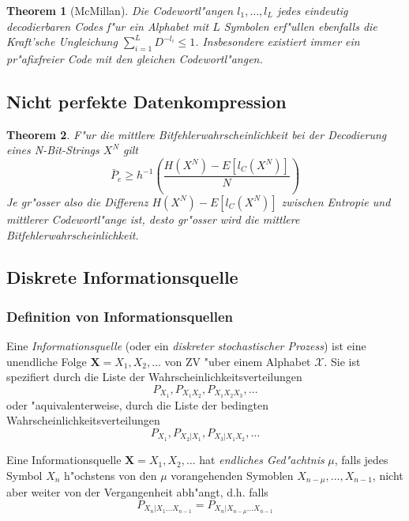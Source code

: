 \documentclass[german, 10pt, a4paper, twocolumn]{scrartcl}
\newtheorem{theorem}{Theorem}
\begin{document}
\begin{theorem}[McMillan]
	Die Codewortl"angen $l_1,\ldots,l_L$ jedes eindeutig decodierbaren Codes f"ur ein Alphabet mit $L$ Symbolen erf"ullen ebenfalls die Kraft'sche Ungleichung $\sum^L_{i=1}D^{-l_i}\leq 1$. Insbesondere existiert immer ein pr"afixfreier Code mit den gleichen Codewortl"angen.
\end{theorem}

\subsection{Nicht perfekte Datenkompression}

\begin{theorem}
	F"ur die mittlere Bitfehlerwahrscheinlichkeit bei der Decodierung eines N-Bit-Strings $X^N$ gilt
	\begin{displaymath}
		\bar{P}_e \geq h^{-1}(\frac{H(X^N)-E[l_C(X^N)]}{N})
	\end{displaymath}
	Je gr"osser also die Differenz $H(X^N)- E[l_C(X^N)]$ zwischen Entropie und mittlerer Codewortl"ange ist, desto gr"osser wird die mittlere Bitfehlerwahrscheinlichkeit.
\end{theorem}

\subsection{Diskrete Informationsquelle}

\subsubsection{Definition von Informationsquellen}

Eine \textit{Informationsquelle} (oder ein \textit{diskreter stochastischer Prozess}) ist eine unendliche Folge $\mathbf{X}=X_1,X_2,\ldots$ von ZV "uber einem Alphabet $\mathcal{X}$. Sie ist spezifiert durch die Liste der Wahrscheinlichkeitsverteilungen
\begin{displaymath}
	P_{X_1},P_{X_1X_2},P_{X_1X_2X_3},\ldots
\end{displaymath}
oder "aquivalenterweise, durch die Liste der bedingten Wahrscheinlichkeitsverteilungen
\begin{displaymath}
	P_{X_1},P_{X_2|X_1},P_{X_3|X_1X_2},\ldots
\end{displaymath}

Eine Informationsquelle $\mathbf{X}=X_1,X_2,\ldots$ hat \textit{endliches Ged"achtnis} $\mu$, falls jedes Symbol $X_n$ h"ochstens von den $\mu$ vorangehenden Symoblen $X_{n-\mu},\ldots,X_{n-1}$, nicht aber weiter von der Vergangenheit abh"angt, d.h. falls
\begin{displaymath}
	P_{X_n|X_1\ldots X_{n-1}} = P_{X_n|X_{n-\mu} \ldots X_{n-1}}
\end{displaymath}
\end{document}
